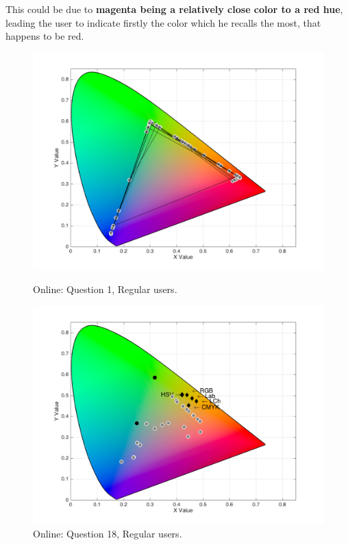 This could be due to \textbf{magenta being a relatively close color to a red hue}, leading the user to indicate firstly the color which he recalls the most, that happens to be red.
%
\begin{figure}[!htbp]
  \centering
  \vspace{-5pt}
  \begin{minipage}{0.4\textwidth}
    \centering
    \includegraphics[width=\textwidth]{images/results/1_online_regularUsers.png}
    \caption[Online: Answers for Question 1, from regular users.]{Online: Question 1, Regular users.}
    \label{fig:yellowblend_1}
  \end{minipage}
  \begin{minipage}{0.4\textwidth}
    \centering
    \includegraphics[width=\textwidth]{images/results/18_online_regularUsers.png}
    \caption[Online: Answers for Question 18, from regular users.]{Online: Question 18, Regular users.}
    \label{fig:yellowblend_2}
  \end{minipage}
  \vspace{-5pt}
\end{figure}
%
